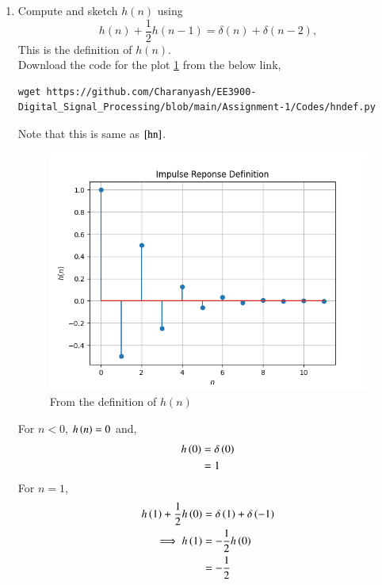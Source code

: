 \documentclass[journal,12pt,twocolumn]{IEEEtran}
\renewcommand\thesection{\arabic{section}}
\begin{document}
\begin{enumerate}[label=\thesection.\arabic*]
\begin{lstlisting}
    \end{lstlisting} 
    \item Compute and sketch $h(n)$ using 
     \begin{equation}
      \label{eq:iir_filter_h}
      h(n) + \frac{1}{2}h(n-1) = \delta(n) + \delta(n-2), 
     \end{equation}
        This is the definition of $h(n)$.\\
    \solution Download the code for the plot \ref{hndef} from the below link,
     \begin{lstlisting}
wget https://github.com/Charanyash/EE3900-Digital_Signal_Processing/blob/main/Assignment-1/Codes/hndef.py
     \end{lstlisting}
     Note that this is same as $\ref{hn}$.\\
     \begin{figure}[ht!]
      \centering
      \includegraphics[width = \columnwidth]{Figs/hndef.png}
      \caption{From the definition of $h(n)$}
      \label{hndef}
     \end{figure}
    For $n <0$, $h\left(n\right) = 0$ and,
     \begin{align} 
       h\left(0\right) &= \delta\left(0\right)\\
                 &= 1
     \end{align}
    For $n =1$,
     \begin{align} 
       h\brak{1} + \frac{1}{2}h\brak{0} &= \delta\brak{1} + \delta\brak{-1}\\
      \implies  h\brak{1}&= -\frac{1}{2}h\brak{0}\\
                         &= -\frac{1}{2}

\end{align}
\end{enumerate}
\end{document}
